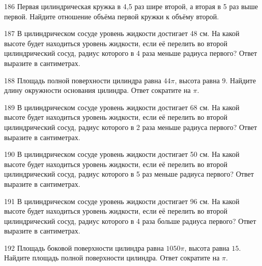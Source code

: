 \documentclass[4apaper]{article}
\begin{document}
\begin{taskBN}{186}
 Первая цилиндрическая кружка в 4,5 раз шире второй, а вторая в 5 раз выше первой. Найдите отношение объёма первой кружки к объёму второй.
\end{taskBN}

\begin{taskBN}{187}
В цилиндрическом сосуде уровень жидкости достигает 48 см. На какой высоте будет находиться уровень жидкости, если её перелить во второй цилиндрический сосуд, радиус которого в 4 раза меньше радиуса первого? Ответ выразите в сантиметрах.
\end{taskBN}

\begin{taskBN}{188}
Площадь полной поверхности цилиндра равна $44\pi$, высота равна $9$. Найдите длину окружности основания цилиндра. Ответ сократите на $\pi$.
\end{taskBN}

\begin{taskBN}{189}
В цилиндрическом сосуде уровень жидкости достигает 68 см. На какой высоте будет находиться уровень жидкости, если её перелить во второй цилиндрический сосуд, радиус которого в 2 раза меньше радиуса первого? Ответ выразите в сантиметрах.
\end{taskBN}

\begin{taskBN}{190}
В цилиндрическом сосуде уровень жидкости достигает 50 см. На какой высоте будет находиться уровень жидкости, если её перелить во второй цилиндрический сосуд, радиус которого в 5 раз меньше радиуса первого? Ответ выразите в сантиметрах.
\end{taskBN}

\begin{taskBN}{191}
В цилиндрическом сосуде уровень жидкости достигает 96 см. На какой высоте будет находиться уровень жидкости, если её перелить во второй цилиндрический сосуд, радиус которого в 4 раза больше радиуса первого? Ответ выразите в сантиметрах.
\end{taskBN}

\begin{taskBN}{192}
Площадь боковой поверхности цилиндра равна $1050\pi$, высота равна $15$. Найдите площадь полной поверхности цилиндра. Ответ сократите на $\pi$.
\end{taskBN}
\end{document}
